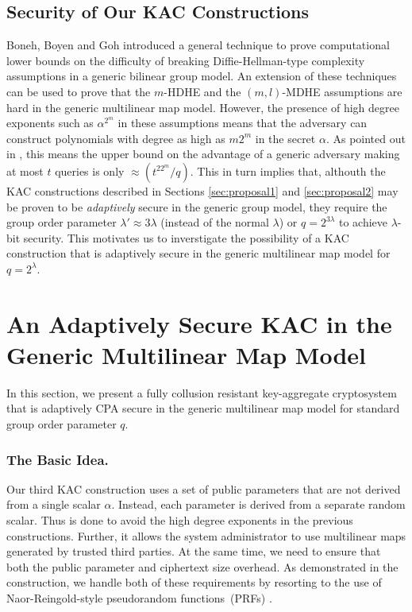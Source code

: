 \subsection{Security of Our KAC Constructions} 
\label{subsec:sec_duo}

Boneh, Boyen and Goh \cite{boneh2005hierarchical} introduced a general technique to prove computational lower bounds on the difficulty of breaking Diffie-Hellman-type complexity assumptions in a generic bilinear group model. An extension of these techniques can be used to prove that the $m$-HDHE and the $(m,l)$-MDHE assumptions are hard in the generic multilinear map model. However, the presence of high degree exponents such as $\alpha^{2^m}$ in these assumptions means that the adversary can construct polynomials with degree as high as $m2^m$ in the secret $\alpha$. As pointed out in \cite{boneh2014low}, this means the upper bound on the advantage of a generic adversary making at most $t$ queries is only $\approx \left(t^22^m/q\right)$. This in turn implies that, althouth the KAC constructions described in Sections \ref{sec:proposal1} and \ref{sec:proposal2} may be proven to be \emph{adaptively} secure in the generic group model, they require the group order parameter $\lambda'\approx{3\lambda}$ (instead of the normal ${\lambda}$) or $q=2^{3\lambda}$ to achieve $\lambda$-bit security. This motivates us to inverstigate the possibility of a KAC construction that is adaptively secure in the generic multilinear map model for $q=2^{\lambda}$.

\section{An Adaptively Secure KAC in the Generic Multilinear Map Model}
\label{sec:proposal3}

In this section, we present a fully collusion resistant key-aggregate cryptosystem that is adaptively CPA secure in the generic multilinear map model for standard group order parameter $q$. 

\subsubsection{The Basic Idea.}  Our third KAC construction uses a set of public parameters that are not derived from a single scalar $\alpha$. Instead, each parameter is derived from a separate random scalar. Thus is done to avoid the high degree exponents in the previous constructions. Further, it allows the system administrator to use multilinear maps generated by trusted third parties. At the same time, we need to ensure that both the public parameter and ciphertext size overhead. As demonstrated in the construction, we handle both of these requirements by resorting to the use of Naor-Reingold-style pseudorandom functions~(PRFs) \cite{naor2004number}.          


